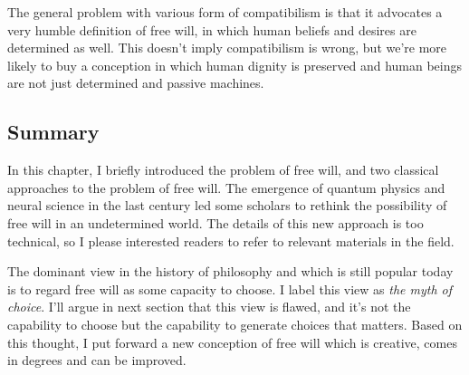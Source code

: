 The general problem with various form of compatibilism is that it advocates a very humble definition of free will, in which human beliefs and desires are determined as well. This doesn't imply compatibilism is wrong, but we're more likely to buy a conception in which human dignity is preserved and human beings are not just determined and passive machines.

\subsection{Summary}

In this chapter, I briefly introduced the problem of free will, and two classical approaches to the problem of free will. The emergence of quantum physics and neural science in the last century led some scholars to rethink the possibility of free will in an undetermined world. The details of this new approach is too technical, so I please interested readers to refer to relevant materials in the field.

The dominant view in the history of philosophy and which is still popular today is to regard free will as some capacity to choose. I label this view as \emph{the myth of choice}. I'll argue in next section that this view is flawed, and it's not the capability to choose but the capability to generate choices that matters. Based on this thought, I put forward a new conception of free will which is creative, comes in degrees and can be improved.
